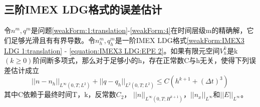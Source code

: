 \subsection{三阶IMEX LDG格式的误差估计}
\begin{theorem}
    令$n^m,q^m$是问题\eqref{weakForm:1:translation}-\ref{weakForm:4}在时间层级m的精确解，它们足够光滑且有有界导数。令$n_h^m,q_h^m$是一阶IMEX LDG格式\eqref{weakForm:IMEX3 LDG 1:translation} - \ref{equation:IMEX3 LDG:EPE 2}。如果有限元空间$V_h^k$是k$(k\geq  0)$阶间断多项式，那么对于足够小的h，存在正常数C与h无关，使得下列误差估计成立
    \begin{equation}
        ||n-n_h||_{L^{\infty}(0,T;L^2)} + ||q - q_h||_{L^2(0,T;L^2)} \leq C(h^{k+1} + (\Delta t)^3)
    \end{equation}
    其中C依赖于最终时间T，k，反常数$C_2$， $||n||_{L^{\infty}(0,T;H^{k+1})}$，$||n_x||_{L^{\infty}}$和$||E||_{L^{\infty}}$。
\end{theorem}
